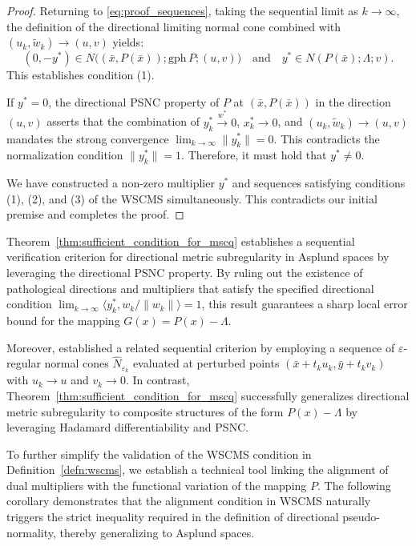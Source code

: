\documentclass[12pt,twoside,reqno]{amsart}
\theoremstyle{definition}
\numberwithin{equation}{section}
\begin{document}
\begin{proof}
    Returning to \eqref{eq:proof_sequences}, taking the sequential limit as $k \to \infty$, the definition of the directional limiting normal cone combined with $(u_k, \tilde{w}_k) \to (u, v)$ yields:
    \begin{equation*}
        (0, -y^*) \in N\bigl((\bar{x}, P(\bar{x})); \mathrm{gph}\, P; (u, v)\bigr) \quad \text{and} \quad y^* \in N(P(\bar{x}); \Lambda; v).
    \end{equation*}
    This establishes condition (1).

    If $y^* = 0$, the directional PSNC property of $P$ at $(\bar{x}, P(\bar{x}))$ in the direction $(u,v)$ asserts that the combination of $y_k^* \xrightarrow{w^*} 0$, $x_k^* \to 0$, and $(u_k, \tilde{w}_k) \to (u, v)$ mandates the strong convergence $\lim_{k \to \infty} \|y_k^*\| = 0$. This contradicts the normalization condition $\|y_k^*\| = 1$. Therefore, it must hold that $y^* \neq 0$.

    We have constructed a non-zero multiplier $y^*$ and sequences satisfying conditions (1), (2), and (3) of the WSCMS simultaneously. This contradicts our initial premise and completes the proof.  
\end{proof}

Theorem~\ref{thm:sufficient_condition_for_mscq} establishes a sequential verification criterion for directional metric subregularity in Asplund spaces by leveraging the directional PSNC property. By ruling out the existence of pathological directions and multipliers that satisfy the specified directional condition $\lim_{k \to \infty} \langle y_k^*, w_k/\|w_k\| \rangle = 1$, this result guarantees a sharp local error bound for the mapping $G(x) = P(x) - \Lambda$. 

Moreover, \cite[Corollary~1]{gfrerer2014metric} established a related sequential criterion by employing a sequence of $\varepsilon$-regular normal cones $\widehat{N}_{\varepsilon_k}$ evaluated at perturbed points $(\bar{x} + t_k u_k, \bar{y} + t_k v_k)$ with $u_k \to u$ and $v_k \to 0$. In contrast, Theorem~\ref{thm:sufficient_condition_for_mscq} successfully generalizes directional metric subregularity to composite structures of the form $P(x) - \Lambda$ by leveraging Hadamard differentiability and PSNC. 

To further simplify the validation of the WSCMS condition in Definition~\ref{defn:wscms}, we establish a technical tool linking the alignment of dual multipliers with the functional variation of the mapping $P$. The following corollary demonstrates that the alignment condition in WSCMS naturally triggers the strict inequality required in the definition of directional pseudo-normality, thereby generalizing \cite[Corollary~4.1]{bai2019directional} to Asplund spaces. 
\end{document}
